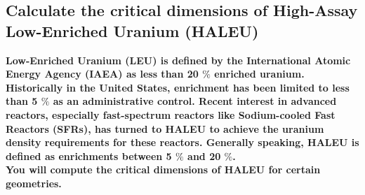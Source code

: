 \documentclass[11pt,a4paper]{article}
\begin{document}
\subsection{Calculate the critical dimensions of High-Assay Low-Enriched Uranium (HALEU)}
\textbf{Low-Enriched Uranium (LEU) is defined by the International Atomic Energy Agency (IAEA)
as less than 20 $\%$ enriched uranium. Historically in the United States, enrichment has been limited
to less than 5 $\%$ as an administrative control. Recent interest in advanced reactors, especially
fast-spectrum reactors like Sodium-cooled Fast Reactors (SFRs), has turned to HALEU to
achieve the uranium density requirements for these reactors. Generally speaking, HALEU is
defined as enrichments between 5 $\%$ and 20 $\%$.
\\
You will compute the critical dimensions of HALEU for certain geometries.}
\end{document}
